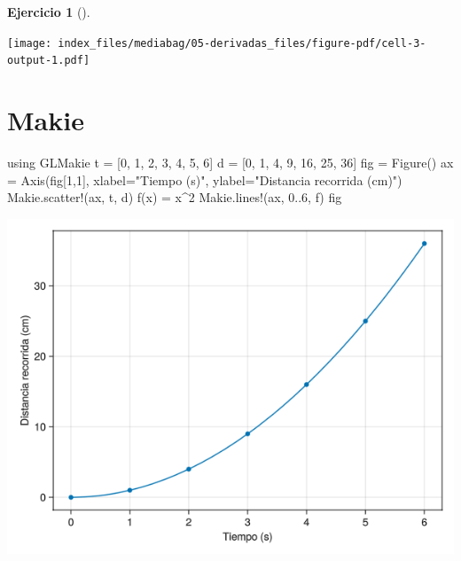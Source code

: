 \documentclass[
  a4paper,
]{scrreport}
\newenvironment{Shaded}{\begin{snugshade}}{\end{snugshade}}
\newcommand{\BuiltInTok}[1]{\textcolor[rgb]{0.00,0.23,0.31}{#1}}
\newcommand{\FloatTok}[1]{\textcolor[rgb]{0.68,0.00,0.00}{#1}}
\newcommand{\FunctionTok}[1]{\textcolor[rgb]{0.28,0.35,0.67}{#1}}
\newcommand{\ImportTok}[1]{\textcolor[rgb]{0.00,0.46,0.62}{#1}}
\newcommand{\NormalTok}[1]{\textcolor[rgb]{0.00,0.23,0.31}{#1}}
\newcommand{\OperatorTok}[1]{\textcolor[rgb]{0.37,0.37,0.37}{#1}}
\newcommand{\StringTok}[1]{\textcolor[rgb]{0.13,0.47,0.30}{#1}}
\theoremstyle{definition}
\newtheorem{exercise}{Ejercicio}[chapter]
\theoremstyle{remark}
\begin{document}
\begin{exercise}[]
\begin{enumerate}
\begin{tcolorbox}
  \texttt{[image: index\_files/mediabag/05-derivadas\_files/figure-pdf/cell-3-output-1.pdf]}

  \section{Makie}

\begin{Shaded}
\begin{Highlighting}[]
\ImportTok{using} \BuiltInTok{GLMakie}
\NormalTok{t }\OperatorTok{=}\NormalTok{ [}\FloatTok{0}\NormalTok{, }\FloatTok{1}\NormalTok{, }\FloatTok{2}\NormalTok{, }\FloatTok{3}\NormalTok{, }\FloatTok{4}\NormalTok{, }\FloatTok{5}\NormalTok{, }\FloatTok{6}\NormalTok{]}
\NormalTok{d }\OperatorTok{=}\NormalTok{ [}\FloatTok{0}\NormalTok{, }\FloatTok{1}\NormalTok{, }\FloatTok{4}\NormalTok{, }\FloatTok{9}\NormalTok{, }\FloatTok{16}\NormalTok{, }\FloatTok{25}\NormalTok{, }\FloatTok{36}\NormalTok{]}
\NormalTok{fig }\OperatorTok{=} \FunctionTok{Figure}\NormalTok{()}
\NormalTok{ax }\OperatorTok{=} \FunctionTok{Axis}\NormalTok{(fig[}\FloatTok{1}\NormalTok{,}\FloatTok{1}\NormalTok{], xlabel}\OperatorTok{=}\StringTok{"Tiempo (s)"}\NormalTok{, ylabel}\OperatorTok{=}\StringTok{"Distancia recorrida (cm)"}\NormalTok{)}
\NormalTok{Makie.}\FunctionTok{scatter!}\NormalTok{(ax, t, d)}
\FunctionTok{f}\NormalTok{(x) }\OperatorTok{=}\NormalTok{ x}\OperatorTok{\^{}}\FloatTok{2}
\NormalTok{Makie.}\FunctionTok{lines!}\NormalTok{(ax, }\FloatTok{0}\OperatorTok{..}\FloatTok{6}\NormalTok{, f)}
\NormalTok{fig}
\end{Highlighting}
\end{Shaded}

  \includegraphics{05-derivadas_files/figure-pdf/cell-4-output-1.png}


\end{tcolorbox}
\end{enumerate}
\end{exercise}
\end{document}

